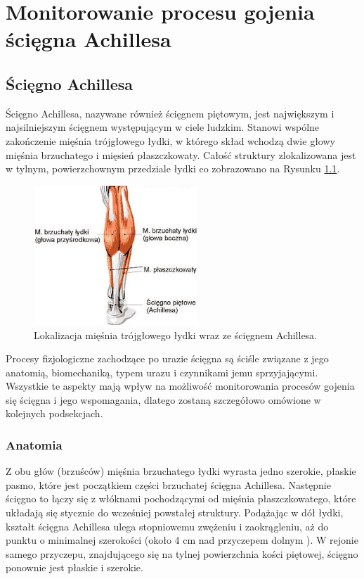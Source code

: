 \chapter{Monitorowanie procesu gojenia ścięgna Achillesa}
\section{Ścięgno Achillesa}
Ścięgno Achillesa, nazywane również ścięgnem piętowym, jest największym i najsilniejszym ścięgnem występującym w ciele ludzkim. Stanowi wspólne zakończenie mięśnia trójgłowego łydki, w którego skład wchodzą dwie głowy mięśnia brzuchatego i mięsień płaszczkowaty. Całość struktury zlokalizowana jest w tylnym, powierzchownym przedziale łydki co zobrazowano na Rysunku \ref{muscle_structure}.  
\begin{figure}[h!]
\centering
\includegraphics[width=0.55\textwidth]{figures/muscleStructure.jpg}
\caption{Lokalizacja mięśnia trójgłowego łydki wraz ze ścięgnem Achillesa.}
\label{muscle_structure}
\end{figure}

Procesy fizjologiczne zachodzące po urazie ścięgna są ściśle związane z jego anatomią, biomechaniką, typem urazu i czynnikami jemu sprzyjającymi. Wszystkie te aspekty mają wpływ na możliwość monitorowania procesów gojenia się ścięgna i jego wspomagania, dlatego zostaną szczegółowo omówione w kolejnych podsekcjach. 

\subsection{Anatomia}

Z obu głów (brzuśców) mięśnia brzuchatego łydki wyrasta jedno szerokie, płaskie pasmo, które jest początkiem części brzuchatej ścięgna Achillesa. Następnie ścięgno to łączy się z włóknami pochodzącymi od mięśnia płaszczkowatego, które układają się stycznie do wcześniej powstałej struktury. Podążając w dół łydki, kształt ścięgna Achillesa ulega stopniowemu zwężeniu i zaokrągleniu, aż do punktu o minimalnej szerokości (około 4 cm nad przyczepem dolnym \cite{Doral2010}). W rejonie samego przyczepu, znajdującego się na tylnej powierzchnia kości piętowej, ścięgno ponownie jest płaskie i szerokie.

